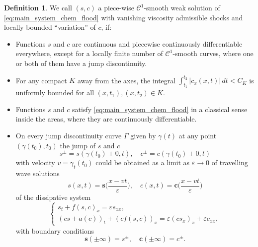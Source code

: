 \documentclass[12pt]{article}
\theoremstyle{definition}
\newtheorem{definition}{Definition}
\begin{document}
\begin{definition}\label{def:solution}
We call $(s, c)$ a piece-wise $\mathcal C^1$-smooth weak solution of \eqref{eq:main_system_chem_flood} with vanishing viscosity admissible shocks and locally bounded ``variation'' of $c$, if:
\begin{itemize}
    \item[(W1)] Functions $s$ and $c$ are continuous and piecewise continuously differentiable everywhere, except for a locally finite number of $\mathcal C^1$-smooth curves, where one or both of them have a jump discontinuity.
    \item[(W2)] For any compact $K$ away from the axes, the integral $\int_{t_1}^{t_2}|c_x(x,t)|\, dt < C_K$ is uniformly bounded for all $(x,t_1), (x,t_2)\in K$.
    \item[(W3)] Functions $s$ and $c$ satisfy \eqref{eq:main_system_chem_flood} in a classical sense inside the areas, where they are continuously differentiable.
    \item[(W4)] On every jump discontinuity curve $\Gamma$ given by $\gamma(t)$ at any point $(\gamma(t_0), t_0)$ the jump of $s$ and $c$ 
    \[
    s^\pm = s(\gamma(t_0)\pm 0, t), \quad c^\pm = c(\gamma(t_0)\pm 0, t)
    \]
    with velocity $v = \gamma_t(t_0)$ could be obtained as a limit as $\varepsilon\to 0$ of travelling wave solutions
    \[
    s(x,t) = \mathbf{s}\Big(\frac{x - vt}{\varepsilon}\Big), \quad c(x,t) = \mathbf{c}\Big(\frac{x - vt}{\varepsilon}\Big)  
    \]
    of the dissipative system
\begin{equation}\label{eq:main_system_dissipative}
\begin{cases} 
s_t + f(s, c)_x = \varepsilon s_{xx}, \\
(cs + a(c))_t + (cf(s,c))_x  = \varepsilon (c s_x)_x + \varepsilon c_{xx},
\end{cases}
\end{equation}
with boundary conditions
\[
\mathbf{s}(\pm\infty) = s^\pm, \quad \mathbf{c}(\pm\infty)  = c^\pm.
\]
\end{itemize}
\end{definition}
\end{document}
